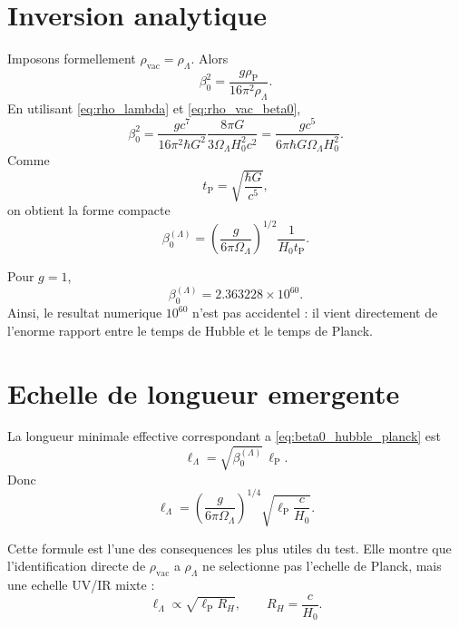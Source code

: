 \documentclass[11pt,a4paper]{article}
\newcommand{\hb}{\hbar}
\newcommand{\lp}{\ell_{\mathrm P}}
\newcommand{\tP}{t_{\mathrm P}}
\newcommand{\rhoP}{\rho_{\mathrm P}}
\newcommand{\rhoL}{\rho_{\Lambda}}
\newcommand{\OmL}{\Omega_{\Lambda}}
\newcommand{\lL}{\ell_{\Lambda}}
\begin{document}
\section{Inversion analytique}

Imposons formellement $\rho_{\mathrm{vac}}=\rhoL$. Alors
\begin{equation}
\beta_0^2
=
\frac{g\rhoP}{16\pi^2\rhoL}.
\end{equation}
En utilisant \eqref{eq:rho_lambda} et \eqref{eq:rho_vac_beta0},
\begin{equation}
\beta_0^2
=
\frac{g c^7}{16\pi^2\hb G^2}
\frac{8\pi G}{3\OmL H_0^2c^2}
=
\frac{g c^5}{6\pi\hb G\OmL H_0^2}.
\end{equation}
Comme
\begin{equation}
\tP=\sqrt{\frac{\hb G}{c^5}},
\end{equation}
on obtient la forme compacte
\begin{equation}
\boxed{
\beta_0^{(\Lambda)}
=
\left(\frac{g}{6\pi\OmL}\right)^{1/2}
\frac{1}{H_0\tP}.
}
\label{eq:beta0_hubble_planck}
\end{equation}

Pour $g=1$,
\begin{equation}
\beta_0^{(\Lambda)}=2.363228\times10^{60}.
\end{equation}
Ainsi, le resultat numerique $10^{60}$ n'est pas accidentel : il vient
directement de l'enorme rapport entre le temps de Hubble et le temps de Planck.

\section{Echelle de longueur emergente}

La longueur minimale effective correspondant a
\eqref{eq:beta0_hubble_planck} est
\begin{equation}
\lL=\sqrt{\beta_0^{(\Lambda)}}\,\lp.
\end{equation}
Donc
\begin{equation}
\boxed{
\lL
=
\left(\frac{g}{6\pi\OmL}\right)^{1/4}
\sqrt{\lp\frac{c}{H_0}}.
}
\label{eq:ell_lambda}
\end{equation}

Cette formule est l'une des consequences les plus utiles du test. Elle montre
que l'identification directe de $\rho_{\mathrm{vac}}$ a $\rhoL$ ne selectionne
pas l'echelle de Planck, mais une echelle UV/IR mixte :
\begin{equation}
\lL\propto\sqrt{\lp R_H},
\qquad
R_H=\frac{c}{H_0}.
\end{equation}
\end{document}
